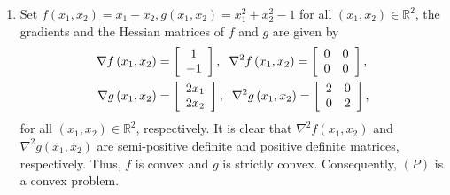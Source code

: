 \documentclass[a4paper]{article}
\numberwithin{equation}{section}
\begin{document}
\begin{enumerate}
\item Set $f\left( {{x_1},{x_2}} \right) = {x_1} - {x_2},g\left( {{x_1},{x_2}} \right) = x_1^2 + x_2^2 - 1$ for all $\left(x_1,x_2\right)\in \mathbb{R}^2$, the gradients and the Hessian matrices of $f$ and $g$ are given by
\begin{align}
\nabla f\left( {{x_1},{x_2}} \right) &= \left[ {\begin{array}{*{20}{c}}
1\\
{ - 1}
\end{array}} \right],\hspace{0.2cm} {\nabla ^2}f\left( {{x_1},{x_2}} \right) = \left[ {\begin{array}{*{20}{c}}
0&0\\
0&0
\end{array}} \right],\\
\nabla g\left( {{x_1},{x_2}} \right) &= \left[ {\begin{array}{*{20}{c}}
{2{x_1}}\\
{2{x_2}}
\end{array}} \right],\hspace{0.2cm} {\nabla ^2}g\left( {{x_1},{x_2}} \right) = \left[ {\begin{array}{*{20}{c}}
2&0\\
0&2
\end{array}} \right],
\end{align}
for all $\left(x_1,x_2\right)\in \mathbb{R}^2$, respectively. It is clear that ${\nabla ^2}f\left( {{x_1},{x_2}} \right)$ and ${\nabla ^2}g\left( {{x_1},{x_2}} \right)$ are semi-positive definite and positive definite matrices, respectively. Thus, $f$ is convex and $g$ is strictly convex. Consequently, $\left(P\right)$ is a convex problem.


\end{enumerate}
\end{document}
